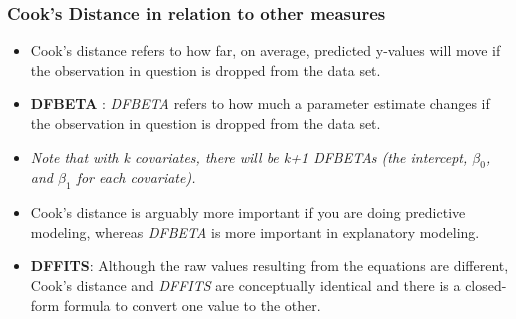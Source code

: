 \documentclass[residuals.tex]{subfiles}
\begin{document}
	
	
	\bigskip	
	
	\subsubsection*{Cook's Distance in relation to other measures}	
	
	\begin{itemize}
		\item Cook's distance refers to how far, on average, predicted y-values will move if the observation in question is dropped from the data set. 
		\item \textbf{DFBETA} :  \textit{DFBETA} refers to how much a parameter estimate changes if the observation in question is dropped from the data set.
		
		\item  \textit{Note that with k covariates, there will be k+1 DFBETAs (the intercept, $\beta_0$, and $\beta_1$ for each covariate).}
		\item  Cook's distance is arguably more important if you are doing predictive modeling, whereas \textit{DFBETA} is more important in explanatory modeling.
		\item \textbf{DFFITS}: Although the raw values resulting from the equations are different, Cook's distance and \textit{DFFITS} are conceptually identical and there is a closed-form formula to convert one value to the other.
	\end{itemize}
	
	
	
	
	
	
\end{document}
